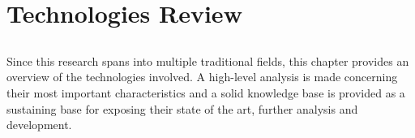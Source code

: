 \chapter{Technologies Review} %
\label{cha:technologies_review}

\section*{} %
Since this research spans into multiple traditional fields, this chapter provides an overview of the technologies involved. A high-level analysis is made concerning their most important characteristics and a solid knowledge base is provided as a sustaining base for exposing their state of the art, further analysis and development.






